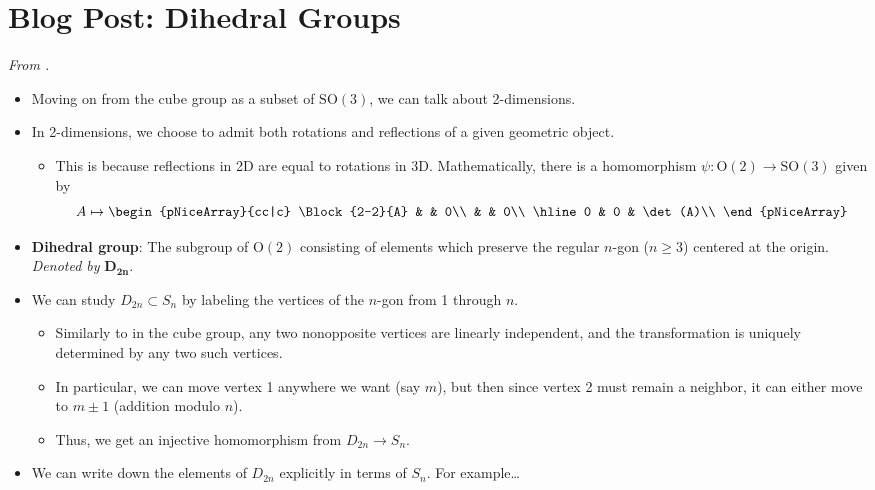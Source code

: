 \documentclass[../notes.tex]{subfiles}
\begin{document}
\section{Blog Post: Dihedral Groups}
\emph{From \textcite{bib:Calegari}.}
\begin{itemize}
    \item {}Moving on from the cube group as a subset of $\text{SO}(3)$, we can talk about 2-dimensions.
    \item In 2-dimensions, we choose to admit both rotations and reflections of a given geometric object.
    \begin{itemize}
        \item This is because reflections in 2D are equal to rotations in 3D. Mathematically, there is a homomorphism $\psi:\text{O}(2)\to\text{SO}(3)$ given by
        \begin{equation*}
            A \mapsto
            \begin{pNiceArray}{cc|c}
                \Block{2-2}{A} &  & 0\\
                 &  & 0\\
                \hline
                0 & 0 & \det(A)\\
            \end{pNiceArray}
        \end{equation*}
    \end{itemize}
    \item \textbf{Dihedral group}: The subgroup of $\text{O}(2)$ consisting of elements which preserve the regular $n$-gon ($n\geq 3$) centered at the origin. \emph{Denoted by} $\bm{D_{2n}}$.
    \item We can study $D_{2n}\subset S_n$ by labeling the vertices of the $n$-gon from 1 through $n$.
    \begin{itemize}
        \item Similarly to in the cube group, any two nonopposite vertices are linearly independent, and the transformation is uniquely determined by any two such vertices.
        \item In particular, we can move vertex 1 anywhere we want (say $m$), but then since vertex 2 must remain a neighbor, it can either move to $m\pm 1$ (addition modulo $n$).
        \item Thus, we get an injective homomorphism from $D_{2n}\to S_n$.
    \end{itemize}
    \item We can write down the elements of $D_{2n}$ explicitly in terms of $S_n$. For example\dots

\end{itemize}
\end{document}
